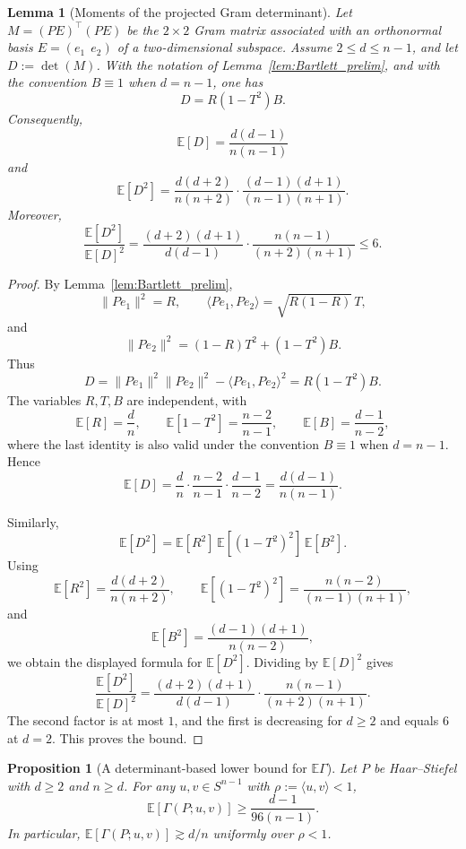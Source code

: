 \documentclass{article}
\newtheorem{lemma}{Lemma}
\newtheorem{proposition}{Proposition}
\begin{document}
\begin{lemma}[Moments of the projected Gram determinant]
\label{lem:Dmoments_clean}
Let \(M=(PE)^\top(PE)\) be the \(2\times2\) Gram matrix associated with an
orthonormal basis \(E=(e_1\ \ e_2)\) of a two-dimensional subspace. Assume
\(2\le d\le n-1\), and let \(D:=\det(M)\). With the notation of
Lemma~\ref{lem:Bartlett_prelim}, and with the convention \(B\equiv1\) when
\(d=n-1\), one has
\[
    D=R(1-T^2)B.
\]
Consequently,
\[
    \mathbb E[D]=\frac{d(d-1)}{n(n-1)}
\]
and
\[
    \mathbb E[D^2]
    =
    \frac{d(d+2)}{n(n+2)}
    \cdot
    \frac{(d-1)(d+1)}{(n-1)(n+1)}.
\]
Moreover,
\[
    \frac{\mathbb E[D^2]}{\mathbb E[D]^2}
    =
    \frac{(d+2)(d+1)}{d(d-1)}
    \cdot
    \frac{n(n-1)}{(n+2)(n+1)}
    \le 6 .
\]
\end{lemma}

\begin{proof}
By Lemma~\ref{lem:Bartlett_prelim},
\[
\|Pe_1\|^2 = R,\qquad
\langle Pe_1,Pe_2\rangle = \sqrt{R(1-R)}\,T,
\]
and
\[
\|Pe_2\|^2 = (1-R)T^2+(1-T^2)B.
\]
Thus
\[
D
=
\|Pe_1\|^2\|Pe_2\|^2-\langle Pe_1,Pe_2\rangle^2
=
R(1-T^2)B.
\]
The variables \(R,T,B\) are independent, with
\[
\mathbb E[R]=\frac dn,\qquad
\mathbb E[1-T^2]=\frac{n-2}{n-1},\qquad
\mathbb E[B]=\frac{d-1}{n-2},
\]
where the last identity is also valid under the convention \(B\equiv1\) when
\(d=n-1\). Hence
\[
\mathbb E[D]
=
\frac dn\cdot\frac{n-2}{n-1}\cdot\frac{d-1}{n-2}
=
\frac{d(d-1)}{n(n-1)}.
\]

Similarly,
\[
\mathbb E[D^2]
=
\mathbb E[R^2]\,
\mathbb E[(1-T^2)^2]\,
\mathbb E[B^2].
\]
Using
\[
\mathbb E[R^2]=\frac{d(d+2)}{n(n+2)},\qquad
\mathbb E[(1-T^2)^2]=\frac{n(n-2)}{(n-1)(n+1)},
\]
and
\[
\mathbb E[B^2]=\frac{(d-1)(d+1)}{n(n-2)},
\]
we obtain the displayed formula for \(\mathbb E[D^2]\). Dividing by
\(\mathbb E[D]^2\) gives
\[
\frac{\mathbb E[D^2]}{\mathbb E[D]^2}
=
\frac{(d+2)(d+1)}{d(d-1)}
\cdot
\frac{n(n-1)}{(n+2)(n+1)}.
\]
The second factor is at most \(1\), and the first is decreasing for \(d\ge2\)
and equals \(6\) at \(d=2\). This proves the bound.
\end{proof}

\begin{proposition}[A determinant-based lower bound for \(\mathbb E\Gamma\)]
\label{prop:Gamma_dn_improved}
Let \(P\) be Haar--Stiefel with \(d\ge2\) and \(n\ge d\). For any
\(u,v\in S^{n-1}\) with \(\rho:=\langle u,v\rangle<1\),
\[
    \mathbb E[\Gamma(P;u,v)]
    \ge
    \frac{d-1}{96(n-1)} .
\]
In particular, \(\mathbb E[\Gamma(P;u,v)]\gtrsim d/n\) uniformly over
\(\rho<1\).
\end{proposition}
\end{document}
